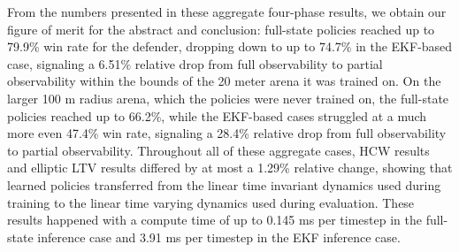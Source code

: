 From the numbers presented in these aggregate four-phase results, we obtain our figure of merit for the abstract and conclusion: full-state policies reached up to 79.9\% win rate for the defender, dropping down to up to 74.7\% in the EKF-based case, signaling a 6.51\% relative drop from full observability to partial observability within the bounds of the 20 meter arena it was trained on. On the larger 100 m radius arena, which the policies were never trained on, the full-state policies reached up to 66.2\%, while the EKF-based cases struggled at a much more even 47.4\% win rate, signaling a 28.4\% relative drop from full observability to partial observability. Throughout all of these aggregate cases, HCW results and elliptic LTV results differed by at most a 1.29\% relative change, showing that learned policies transferred from the linear time invariant dynamics used during training to the linear time varying dynamics used during evaluation. These results happened with a compute time of up to 0.145 ms per timestep in the full-state inference case and 3.91 ms per timestep in the EKF inference case.






